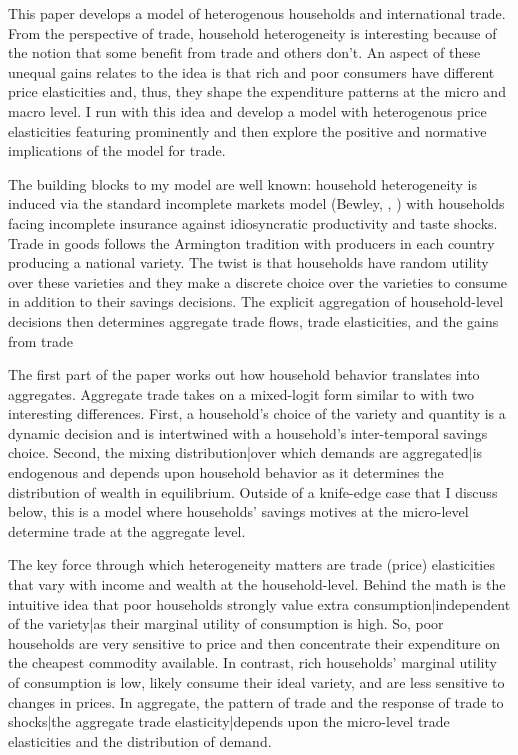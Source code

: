 \documentclass[12pt,pdftex]{article}
\begin{document}
\begin{onehalfspacing}
\hspace{-0.05cm}



\thispagestyle{empty}
\newpage
\normalsize

This paper develops a model of heterogenous households and international trade. From the perspective of trade, household heterogeneity is interesting because of the notion that some benefit from trade and others don't. An aspect of these unequal gains relates to the idea is that rich and poor consumers have different price elasticities and, thus, they shape the expenditure patterns at the micro and macro level. I run with this idea and develop a model with heterogenous price elasticities featuring prominently and then explore the positive and normative implications of the model for trade.

The building blocks to my model are well known: household heterogeneity is induced via the standard incomplete markets model (Bewley, \citet{huggett1993risk}, \citet{aiyagari1994uninsured}) with households facing incomplete insurance against idiosyncratic productivity and taste shocks. Trade in goods follows the Armington tradition with producers in each country producing a national variety. The twist is that households have random utility over these varieties and they make a discrete choice over the varieties to consume in addition to their savings decisions. The explicit aggregation of household-level decisions then determines aggregate trade flows, trade elasticities, and the gains from trade

The first part of the paper works out how household behavior translates into aggregates. Aggregate trade takes on a mixed-logit form similar to \citet*{berry1995automobile} with two interesting differences. First,  a household's choice of the variety and quantity is a dynamic decision and is intertwined with a household's inter-temporal savings choice. Second, the mixing distribution|over which demands are aggregated|is endogenous and depends upon household behavior as it determines the distribution of wealth in equilibrium. Outside of a knife-edge case that I discuss below, this is a model where households' savings motives at the micro-level determine trade at the aggregate level.

The key force through which heterogeneity matters are trade (price) elasticities that vary with income and wealth at the household-level. Behind the math is the intuitive idea that poor households strongly value extra consumption|independent of the variety|as their marginal utility of consumption is high. So, poor households are very sensitive to price and then concentrate their expenditure on the cheapest commodity available. In contrast, rich households' marginal utility of consumption is low, likely consume their ideal variety, and are less sensitive to changes in prices. In aggregate, the pattern of trade and the response of trade to shocks|the aggregate trade elasticity|depends upon the micro-level trade elasticities and the distribution of demand.


\end{onehalfspacing}
\end{document}
